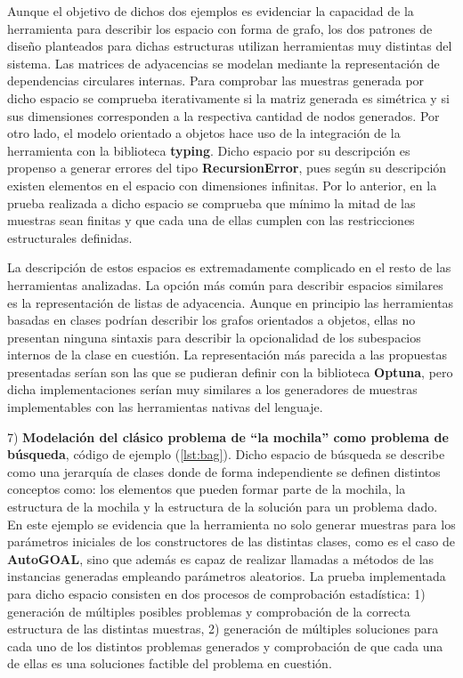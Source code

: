 Aunque el objetivo de dichos dos ejemplos es evidenciar la capacidad de la herramienta para describir los espacio con forma
de grafo, los dos patrones de diseño planteados para dichas estructuras utilizan herramientas muy distintas del sistema. Las
matrices de adyacencias se modelan mediante la representación de dependencias circulares internas. Para comprobar las muestras
generada por dicho espacio se comprueba iterativamente si la matriz generada es simétrica y si sus dimensiones corresponden a
la respectiva cantidad de nodos generados. Por otro lado, el modelo orientado a objetos hace uso de la integración de la
herramienta con la biblioteca {\bf typing}. Dicho espacio por su descripción es propenso a generar errores del tipo {\bf RecursionError},
pues según su descripción existen elementos en el espacio con dimensiones infinitas. Por lo anterior, en la prueba realizada a
dicho espacio se comprueba que mínimo la mitad de las muestras sean finitas y que cada una de ellas cumplen con las
restricciones estructurales definidas.

La descripción de estos espacios es extremadamente complicado en el resto de las herramientas analizadas. La opción más común
para describir espacios similares es la representación de listas de adyacencia. Aunque en principio las herramientas basadas
en clases podrían describir los grafos orientados a objetos, ellas no presentan ninguna sintaxis para describir la opcionalidad
de los subespacios internos de la clase en cuestión. La representación más parecida a las propuestas presentadas serían son las que se pudieran
definir con la biblioteca {\bf Optuna}, pero dicha implementaciones serían muy similares a los generadores de muestras implementables
con las herramientas nativas del lenguaje.

7) {\bf Modelación del clásico problema de ``la mochila'' como problema de búsqueda}, código de ejemplo (\ref{lst:bag}). Dicho espacio de búsqueda se describe como una
jerarquía de clases donde de forma independiente se definen distintos conceptos como: los elementos que pueden formar parte de
la mochila, la estructura de la mochila y la estructura de la solución para un problema dado. En este ejemplo se evidencia que la
herramienta no solo generar muestras para los parámetros iniciales de los constructores de las distintas clases, como es el caso de
      {\bf AutoGOAL}, sino que además es capaz de realizar llamadas a métodos de las instancias generadas empleando parámetros aleatorios. La
prueba implementada para dicho espacio consisten en dos procesos de comprobación estadística: 1) generación de múltiples posibles
problemas y comprobación de la correcta estructura de las distintas muestras, 2) generación de múltiples soluciones para cada uno
de los distintos problemas generados y comprobación de que cada una de ellas es una  soluciones factible del problema en cuestión.

